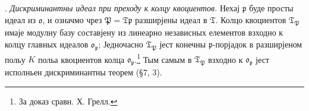 \documentclass[11pt]{article}
\newcommand{\mo}{\mathfrak{o}}
\newcommand{\mT}{\mathfrak{T}}
\newcommand{\mP}{\mathfrak{P}}
\newcommand{\mpideal}{\mathfrak{p}}
\begin{document}
\setcounter{footnote}{37}

. \emph{Дискриминантны идеал при преходу к колцу квоциентов.} Нехај $\mpideal$ буде просты идеал из $\mo$, и означмо чрез $\mP=\mT\mpideal$ разширјены идеал в $\mT$. Колцо квоциентов $\mT_\mP$ имаје модулну базу составјену из линеарно независных елементов взходно к колцу главных идеалов $\mo_\mpideal$; Једночасно $\mT_\mP$ јест конечны $\mpideal$-порјадок в разширјеном польу $K$ польа квоциентов колца $\mo_\mpideal$.\footnote{За доказ сравн. Х. Грелл.} Тым самым в $\mT_\mP$ взходно к $\mo_\mpideal$ јест исполньен дискриминантны теорем (§7, 3).
\end{document}
